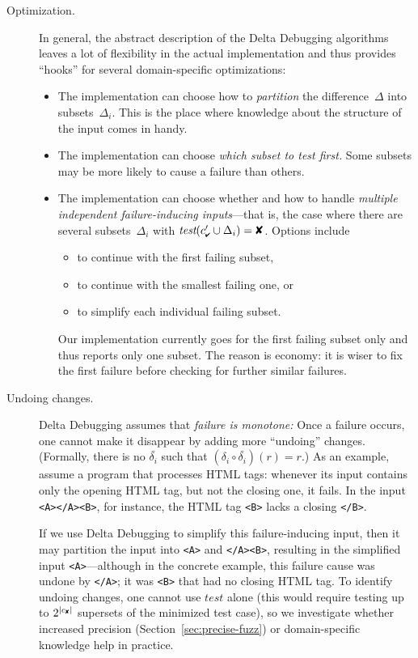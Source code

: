 \documentclass{acm_proc_article-sp}
\newcommand{\HTML}       {{\small HTML}\xspace}
\newcommand{\PASS}{\text{\ding{52}}\xspace}
\newcommand{\FAIL}{\text{\ding{56}}\xspace}
\newcommand{\cfail}{{c_{\scriptscriptstyle \FAIL}}}
\newcommand{\dpass}{{c'_{\scriptscriptstyle \PASS}}}
\newcommand{\test}{\textit{test}\xspace}
\theoremstyle{plain}
\begin{document}
\begin{description}
\item[Optimization.]  In general, the abstract description of the
  Delta Debugging algorithms leaves a lot of flexibility in the actual
  implementation and thus provides ``hooks'' for several
  domain-specific optimizations:
\begin{itemize}
\item The implementation can choose how to \emph{partition} the
  difference~$\Delta$ into subsets~$\Delta_i$.  This is the place where
  knowledge about the structure of the input comes in handy.
\item The implementation can choose \emph{which subset to test first.}
  Some subsets may be more likely to cause a failure than others.
\item The implementation can choose whether and how to handle
  \emph{multiple independent failure-inducing inputs}---that is, the
  case where there are several subsets~$\Delta_i$ with
  $\test(\dpass \cup \Delta_i) = \FAIL$.  Options include
  \begin{itemize}
  \item to continue with the first failing subset,
  \item to continue with the smallest failing one, or 
  \item to simplify each individual failing subset.
  \end{itemize}
  Our implementation currently goes for the first failing subset only
  and thus reports only one subset.  The reason is economy: it is
  wiser to fix the first failure before checking for further similar
  failures.
\end{itemize}

\item[Undoing changes.]  Delta Debugging assumes that \emph{failure is
    monotone:} Once a failure occurs, one cannot make it disappear by
  adding more ``undoing'' changes.  (Formally, there is no $\bar{\delta_i}$
  such that $(\delta_i \circ \bar{\delta_i})(r) = r$.)  As an example, assume a
  program that processes \HTML tags: whenever its input contains only
  the opening \HTML tag, but not the closing one, it fails.  In the
  input \texttt{<A></A><B>}, for instance, the \HTML tag \texttt{<B>}
  lacks a closing \texttt{</B>}.
  
  If we use Delta Debugging to simplify this failure-inducing input,
  then it may partition the input into \texttt{<A>} and
  \texttt{</A><B>}, resulting in the simplified input
  \texttt{<A>}---although in the concrete example, this failure cause
  was undone by \texttt{</A>}; it was \texttt{<B>} that had no closing
  \HTML tag.  To identify undoing changes, one cannot use $\test$
  alone (this would require testing up to $2^{|\cfail|}$ supersets of
  the minimized test case), so we investigate whether increased
  precision (Section~\ref{sec:precise-fuzz}) or domain-specific
  knowledge help in practice.
  

\end{description}
\end{document}
